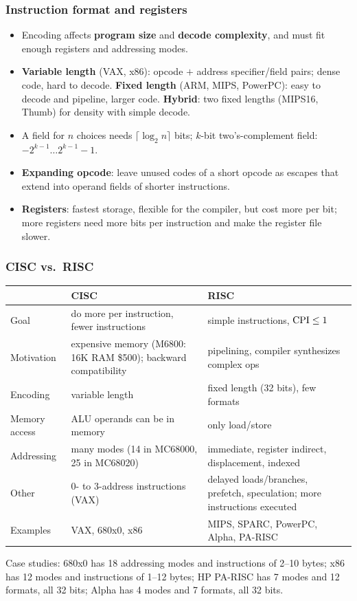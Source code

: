 \subsubsection{Instruction format and registers}
\begin{itemize}[leftmargin=*]
  \item Encoding affects \textbf{program size} and \textbf{decode
  complexity}, and must fit enough registers and addressing modes.
  \item \textbf{Variable length} (VAX, x86): opcode $+$ address specifier/field
  pairs; dense code, hard to decode. \textbf{Fixed length} (ARM, MIPS,
  PowerPC): easy to decode and pipeline, larger code. \textbf{Hybrid}: two
  fixed lengths (MIPS16, Thumb) for density with simple decode.
  \item A field for $n$ choices needs $\lceil\log_2 n\rceil$ bits; $k$-bit
  two's-complement field: $-2^{k-1}\ldots2^{k-1}-1$.
  \item \textbf{Expanding opcode}: leave unused codes of a short opcode as
  escapes that extend into operand fields of shorter instructions.
  \item \textbf{Registers}: fastest storage, flexible for the compiler, but
  cost more per bit; more registers need more bits per instruction and make the
  register file slower.
\end{itemize}

\subsubsection{CISC vs.\ RISC}
\begin{center}
\small
\begin{tabular}{@{}p{3cm}p{5.6cm}p{5.6cm}@{}}
\toprule
& CISC & RISC \\
\midrule
Goal & do more per instruction, fewer instructions & simple instructions, $\mathrm{CPI}\le1$ \\
Motivation & expensive memory (M6800: 16K RAM \$500); backward compatibility & pipelining, compiler synthesizes complex ops \\
Encoding & variable length & fixed length (32 bits), few formats \\
Memory access & ALU operands can be in memory & only load/store \\
Addressing & many modes (14 in MC68000, 25 in MC68020) & immediate, register indirect, displacement, indexed \\
Other & 0- to 3-address instructions (VAX) & delayed loads/branches, prefetch, speculation; more instructions executed \\
Examples & VAX, 680x0, x86 & MIPS, SPARC, PowerPC, Alpha, PA-RISC \\
\bottomrule
\end{tabular}
\end{center}
Case studies: 680x0 has 18 addressing modes and instructions of 2--10 bytes;
x86 has 12 modes and instructions of 1--12 bytes; HP PA-RISC has 7 modes and 12
formats, all 32 bits; Alpha has 4 modes and 7 formats, all 32 bits.

